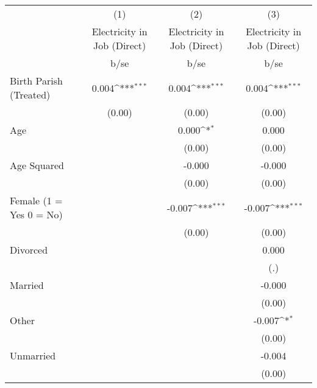 {
\def\sym#1{\ifmmode^{#1}\else\(^{#1}\)\fi}
\begin{tabular}{l*{3}{c}}
\hline\hline
                    &\multicolumn{1}{c}{(1)}&\multicolumn{1}{c}{(2)}&\multicolumn{1}{c}{(3)}\\
                    &\multicolumn{1}{c}{Electricity in Job (Direct)}&\multicolumn{1}{c}{Electricity in Job (Direct)}&\multicolumn{1}{c}{Electricity in Job (Direct)}\\
                    &        b/se         &        b/se         &        b/se         \\
\hline
Birth Parish (Treated)&       0.004\sym{***}&       0.004\sym{***}&       0.004\sym{***}\\
                    &      (0.00)         &      (0.00)         &      (0.00)         \\
Age                 &                     &       0.000\sym{*}  &       0.000         \\
                    &                     &      (0.00)         &      (0.00)         \\
Age Squared         &                     &      -0.000         &      -0.000         \\
                    &                     &      (0.00)         &      (0.00)         \\
Female (1 = Yes 0 = No)&                     &      -0.007\sym{***}&      -0.007\sym{***}\\
                    &                     &      (0.00)         &      (0.00)         \\
Divorced            &                     &                     &       0.000         \\
                    &                     &                     &         (.)         \\
Married             &                     &                     &      -0.000         \\
                    &                     &                     &      (0.00)         \\
Other               &                     &                     &      -0.007\sym{*}  \\
                    &                     &                     &      (0.00)         \\
Unmarried           &                     &                     &      -0.004         \\
                    &                     &                     &      (0.00)         \\

\end{tabular}}
